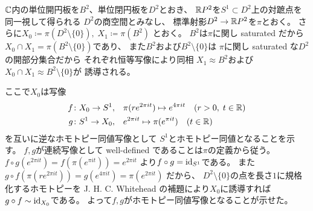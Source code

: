 \documentclass[report]{jlreq}
\begin{document}
\begin{answer}
    $\mathbb{C}$内の単位開円板を$B^2$、単位閉円板を$D^2$とおき、
    $\mathbb{R} P^2$を$S^1 \subset D^2$上の対蹠点を同一視して得られる
    $D^2$の商空間とみなし、
    標準射影$D^2 \to \mathbb{R} P^2$を$\pi$とおく。
    さらに$X_0 \coloneqq \pi(D^2 \setminus \{ 0 \}), \;
        X_1 \coloneqq \pi(B^2)$
    とおく。
    $B^2$は$\pi$に関し saturated だから
    $X_0 \cap X_1 = \pi(B^2 \setminus \{ 0 \})$であり、
    また$B^2$および$B^2 \setminus \{ 0 \}$は
    $\pi$に関し saturated な$D^2$の開部分集合だから
    それぞれ恒等写像により同相
    $X_1 \approx B^2$および$X_0 \cap X_1 \approx B^2 \setminus \{ 0 \}$が
    誘導される。

    ここで$X_0$は写像
    \begin{alignat}{1}
        f \colon X_0 \to S^1,
            \quad
            &\pi(re^{2\pi it}) \mapsto e^{4\pi it}
            \quad (r > 0, \; t \in \mathbb{R}) \\
        g \colon S^1 \to X_0,
            \quad
            &e^{2\pi it} \mapsto \pi(e^{\pi it})
            \quad (t \in \mathbb{R})
    \end{alignat}
    を互いに逆なホモトピー同値写像として
    $S^1$とホモトピー同値となることを示す。
    $f, g$が連続写像として well-defined であることは$\pi$の定義から従う。
    $f \circ g(e^{2\pi it}) = f(\pi(e^{\pi it})) = e^{2\pi it}$
    より$f \circ g = \mathrm{id}_{S^1}$である。
    また$g \circ f(\pi(re^{2\pi it}))
        = g(e^{4\pi it})
        = \pi(e^{2\pi it})$
    だから、
    $D^2 \setminus \{ 0 \}$の点を長さ$1$に規格化するホモトピーを
    J. H. C. Whitehead の補題により$X_0$に誘導すれば
    $g \circ f \sim \mathrm{id}_{X_0}$である。
    よって$f, g$がホモトピー同値写像となることが示せた。


\end{answer}
\end{document}
